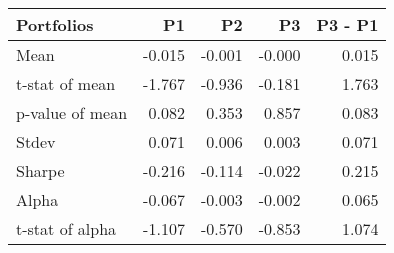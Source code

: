 \begin{tabular}{lrrrr}
\toprule
Portfolios & P1 & P2 & P3 & P3 - P1 \\
\midrule
Mean & -0.015 & -0.001 & -0.000 & 0.015 \\
t-stat of mean & -1.767 & -0.936 & -0.181 & 1.763 \\
p-value of mean & 0.082 & 0.353 & 0.857 & 0.083 \\
Stdev & 0.071 & 0.006 & 0.003 & 0.071 \\
Sharpe & -0.216 & -0.114 & -0.022 & 0.215 \\
Alpha & -0.067 & -0.003 & -0.002 & 0.065 \\
t-stat of alpha & -1.107 & -0.570 & -0.853 & 1.074 \\
\bottomrule
\end{tabular}
